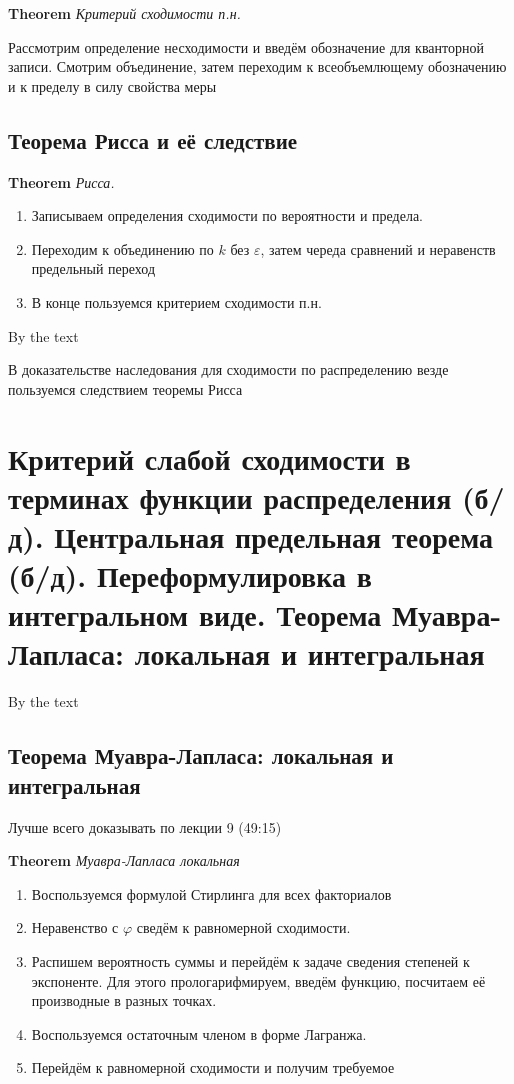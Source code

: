 \documentclass[a4paper, 14pt]{article}
\begin{document}
    \textbf{Theorem} \textit{Критерий сходимости п.н.}
    
    Рассмотрим определение несходимости и введём обозначение для кванторной записи.
    Смотрим объединение, затем переходим к всеобъемлющему обозначению и к пределу в силу свойства меры
    
    \subsection{Теорема Рисса и её следствие}
    
    \textbf{Theorem} \textit{Рисса.}
    
    \begin{enumerate}
        \item Записываем определения сходимости по вероятности и предела.
        \item Переходим к объединению по $k$ без $\varepsilon$, затем череда сравнений и неравенств предельный переход
        \item В конце пользуемся критерием сходимости п.н.
    \end{enumerate}
    
    By the text
    
    В доказательстве наследования для сходимости по распределению везде пользуемся следствием теоремы Рисса
    
    \section{Критерий слабой сходимости в терминах функции распределения (б/д).
    Центральная предельная теорема (б/д).
    Переформулировка в интегральном виде.
    Теорема Муавра-Лапласа: локальная и интегральная}
    
    By the text
    
    \subsection{Теорема Муавра-Лапласа: локальная и интегральная}
    
    Лучше всего доказывать по лекции 9 (49:15)
    
    \textbf{Theorem} \textit{Муавра-Лапласа локальная}
    
    \begin{enumerate}
        \item Воспользуемся формулой Стирлинга для всех факториалов
        \item Неравенство с $\varphi$ сведём к равномерной сходимости.
        \item Распишем вероятность суммы и перейдём к задаче сведения степеней к экспоненте.
        Для этого прологарифмируем, введём функцию, посчитаем её производные в разных точках.
        \item Воспользуемся остаточным членом в форме Лагранжа.
        \item Перейдём к равномерной сходимости и получим требуемое
    \end{enumerate}
    
\end{document}
